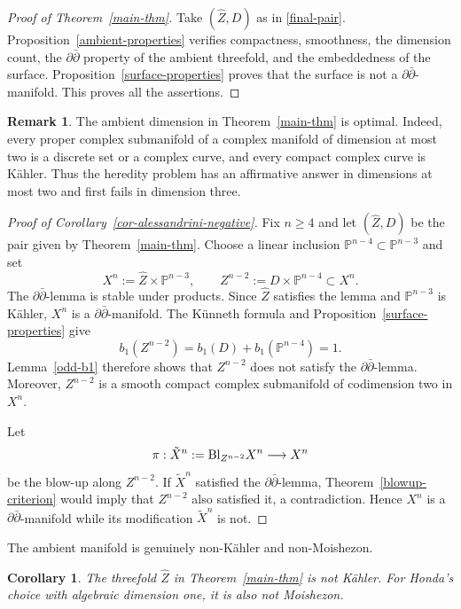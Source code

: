 \documentclass[11pt]{amsart}
\numberwithin{equation}{section}
\def\Bl{{\rm Bl}}
\theoremstyle{plain}
\newtheorem{cor}[thm]{Corollary}
\theoremstyle{definition}
\newtheorem{rem}[thm]{Remark}
\begin{document}
\begin{proof}[Proof of Theorem~\ref{main-thm}]
Take $(\widehat Z,D)$ as in \eqref{final-pair}.
Proposition~\ref{ambient-properties} verifies compactness, smoothness, the dimension
count, the $\partial\bar\partial$ property of the ambient threefold, and the
embeddedness of the surface.  Proposition~\ref{surface-properties} proves
that the surface is not a $\partial\bar\partial$-manifold.  This proves all
the assertions.
\end{proof}

\begin{rem}\label{rem-heredity-sharpness}
The ambient dimension in Theorem~\ref{main-thm} is optimal.  Indeed, every
proper complex submanifold of a complex manifold of dimension at most two is
a discrete set or a complex curve, and every compact complex curve is
K\"ahler.  Thus the heredity problem has an affirmative answer in dimensions
at most two and first fails in dimension three.
\end{rem}

\begin{proof}[Proof of Corollary~\ref{cor-alessandrini-negative}]
Fix $n\geq4$ and let $(\widehat Z,D)$ be the pair given by
Theorem~\ref{main-thm}.  Choose a linear inclusion
$\mathbb P^{n-4}\subset\mathbb P^{n-3}$ and set
\[
X^{n}:=\widehat Z\times\mathbb P^{n-3},
\qquad
Z^{n-2}:=D\times\mathbb P^{n-4}\subset X^{n}.
\]
The $\partial\bar\partial$-lemma is stable under products.  Since
$\widehat Z$ satisfies the lemma and $\mathbb P^{n-3}$ is K\"ahler, $X^{n}$
is a $\partial\bar\partial$-manifold.  The K\"unneth formula and
Proposition~\ref{surface-properties} give
\[
b_1(Z^{n-2})=b_1(D)+b_1(\mathbb P^{n-4})=1.
\]
Lemma~\ref{odd-b1} therefore shows that $Z^{n-2}$ does not satisfy the
$\partial\bar\partial$-lemma.  Moreover, $Z^{n-2}$ is a smooth compact complex
submanifold of codimension two in $X^{n}$.

Let
\[
\pi:\tilde{X}^{n}:=\Bl_{Z^{n-2}}X^{n}\longrightarrow X^{n}
\]
be the blow-up along $Z^{n-2}$.  If $\tilde{X}^{n}$ satisfied the
$\partial\bar\partial$-lemma, Theorem~\ref{blowup-criterion} would imply that
$Z^{n-2}$ also satisfied it, a contradiction.  Hence $X^{n}$ is a
$\partial\bar\partial$-manifold while its modification $\tilde{X}^{n}$ is
not.
\end{proof}

The ambient manifold is genuinely non-K\"ahler and non-Moishezon.

\begin{cor}\label{nonkahler-ambient}
The threefold $\widehat Z$ in Theorem~\ref{main-thm} is not K\"ahler.  For
Honda's choice with algebraic dimension one, it is also not Moishezon.
\end{cor}
\end{document}
